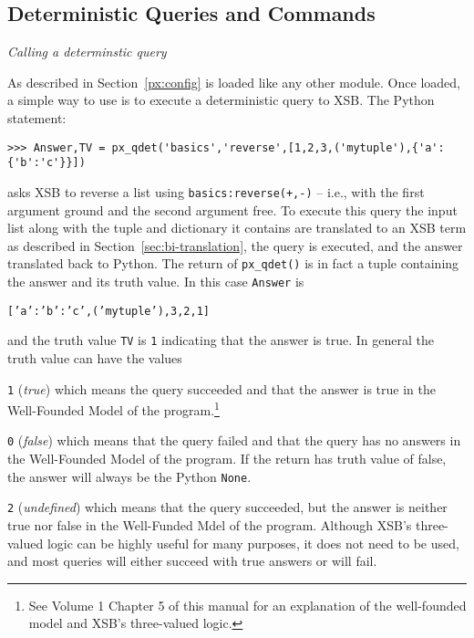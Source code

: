 \subsection{Deterministic Queries and Commands} \label{sec:pxdet}

\begin{example} \rm
{\em Calling a determinstic query}
  
  As described in Section~\ref{px:config} \px{} is loaded like any
  other module.  Once loaded, a simple way to use \px{} is to
  execute a deterministic query to XSB.  The Python statement:

\begin{verbatim}  
>>> Answer,TV = px_qdet('basics','reverse',[1,2,3,('mytuple'),{'a':{'b':'c'}}])
\end{verbatim}

\noindent
  asks XSB to reverse a list using {\tt basics:reverse(+,-)} -- i.e.,
  with the first argument ground and the second argument free.  To
  execute this query the input list along with the tuple and
  dictionary it contains are translated to an XSB term as described in
  Section~\ref{sec:bi-translation}, the query is executed, and the
  answer translated back to Python.  The return of {\tt px\_qdet()} is
  in fact a tuple containing the answer and its truth value.  In this
  case {\tt Answer} is

  {\tt [{'a':{'b':'c'}},('mytuple'),3,2,1]}

\noindent    
and the truth value {\tt TV} is {\tt 1} indicating that the answer is
true.  In general the truth value can have the values

\bi
\item {\tt 1} ({\em true}) which means the query succeeded and that
  the answer is true in the Well-Founded Model of the
  program.\footnote{See Volume 1 Chapter 5 of this manual for an
    explanation of the well-founded model and XSB's three-valued
    logic.}
\item {\tt 0} ({\em false}) which means that the query failed and that
  the query has no answers in the Well-Founded Model of the program.
  If the return has truth value of false, the answer will always be
  the Python {\tt None}.
\item {\tt 2} ({\em undefined}) which means that the query succeeded,
  but the answer is neither true nor false in the Well-Funded Mdel of
  the program.
  \ei
\noindent
Although XSB's three-valued logic can be highly useful for many
purposes, it does not need to be used, and most queries will either
succeed with true answers or will fail.


\end{example}
